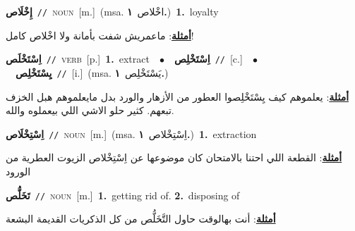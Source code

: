 \documentclass[10pt,a4paper,twoside]{article} %
\begin{document}
\begin{multicols}{2}
{\setlength\topsep{0pt}\textbf{\foreignlanguage{arabic}{إِخْلَاص}}\ {\color{gray}\texttt{//}\color{black}}\ \textsc{noun}\ [m.]\ \color{gray}(msa. \foreignlanguage{arabic}{اخْلاص}~\foreignlanguage{arabic}{\textbf{١.}})\color{black}\ \textbf{1.}~loyalty\  \begin{flushright}\color{gray}\foreignlanguage{arabic}{\textbf{\underline{\foreignlanguage{arabic}{أمثلة}}}: ماعمريش شفت بأمانة ولا اخْلاص كامل!}\end{flushright}\color{black}} \vspace{2mm}

{\setlength\topsep{0pt}\textbf{\foreignlanguage{arabic}{اِسْتَخْلَص}}\ {\color{gray}\texttt{//}\color{black}}\ \textsc{verb}\ [p.]\ \textbf{1.}~extract\ \ $\bullet$\ \ \setlength\topsep{0pt}\textbf{\foreignlanguage{arabic}{اِسْتَخْلِص}}\ {\color{gray}\texttt{//}\color{black}}\ [c.]\ \ $\bullet$\ \ \setlength\topsep{0pt}\textbf{\foreignlanguage{arabic}{يِسْتَخْلِص}}\ {\color{gray}\texttt{//}\color{black}}\ [i.]\ \color{gray}(msa. \foreignlanguage{arabic}{يَسْتَخْلِص}~\foreignlanguage{arabic}{\textbf{١.}})\color{black}\  \begin{flushright}\color{gray}\foreignlanguage{arabic}{\textbf{\underline{\foreignlanguage{arabic}{أمثلة}}}: يعلموهم كيف يِسْتَخْلِصوا العطور من الأزهار والورد بدل مايعلموهم هبل الخزف تبعهم. كثير حلو الاشي اللي بيعملوه والله.}\end{flushright}\color{black}} \vspace{2mm}

{\setlength\topsep{0pt}\textbf{\foreignlanguage{arabic}{اِسْتِخْلَاص}}\ {\color{gray}\texttt{//}\color{black}}\ \textsc{noun}\ [m.]\ \color{gray}(msa. \foreignlanguage{arabic}{اِسْتِخْلاص}~\foreignlanguage{arabic}{\textbf{١.}})\color{black}\ \textbf{1.}~extraction\  \begin{flushright}\color{gray}\foreignlanguage{arabic}{\textbf{\underline{\foreignlanguage{arabic}{أمثلة}}}: القطعة اللي احتنا بالامتحان كان موضوعها عن اِسْتِخْلاص الزيوت العطرية من الورود}\end{flushright}\color{black}} \vspace{2mm}

{\setlength\topsep{0pt}\textbf{\foreignlanguage{arabic}{تَخَلُّص}}\ {\color{gray}\texttt{//}\color{black}}\ \textsc{noun}\ [m.]\ \textbf{1.}~getting rid of.  \textbf{2.}~disposing of\  \begin{flushright}\color{gray}\foreignlanguage{arabic}{\textbf{\underline{\foreignlanguage{arabic}{أمثلة}}}: أنت بهالوقت حاول التَّخَلُّص من كل الذكريات القديمة البشعة}\end{flushright}\color{black}} \vspace{2mm}


\end{multicols}
\end{document}
